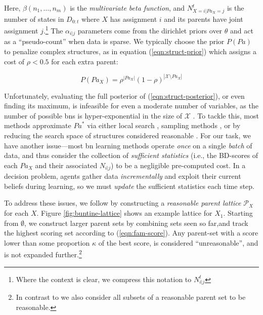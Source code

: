 \documentclass{article}
\newcommand{\bn}{{\sc bn}}
\newcommand{\Pa}{\mathit{Pa}}
\begin{document}
	Here, $\beta(n_1, \dots, n_m)$ is the \emph{multivariate beta function}, and $N^t_{X=i|\Pa_X=j}$ is the number of states in $D_{0:t}$ where $X$ has assignment $i$ and its parents have joint assignment $j$.\footnote{Where the context is clear, we compress this notation to $N^t_{i|j}$} The $\alpha_{i|j}$ parameters come from the dirichlet priors over $\theta$ and act as a ``pseudo-count'' when data is sparse. We typically choose the prior $P(\Pa)$ to penalize complex structures, as in equation (\ref{eqn:struct-prior}) which assigns a cost of $\rho < 0.5$ for each extra parent:
	
	\begin{equation}
	\label{eqn:struct-prior}
	P(\Pa_X) = \rho^{|\Pa_X|} (1 - \rho)^{|\mathcal{X} \setminus \Pa_X|}
	\end{equation}
	
	Unfortunately, evaluating the full posterior of (\ref{eqn:struct-posterior}), or even finding its maximum, is infeasible for even a moderate number of variables, as the number of possible \bn{}s is hyper-exponential in the size of $\mathcal{X}$ \cite{tian_computing_2009}. To tackle this, most methods approximate $\Pa^*$ via either local search \cite{teyssier_ordering-based_2005}, sampling methods \cite{madigan_bayesian_1995}, or by reducing the search space of structures considered reasonable \cite{buntine_theory_1991}. For our task, we have another issue---most \bn{} learning methods operate \emph{once} on a single \emph{batch} of data, and thus consider the collection of \emph{sufficient statistics} (i.e., the BD-scores of each $\Pa_X$ and their associated $N_{i|j}$) to be a negligible pre-computed cost. In a decision problem, agents gather data \emph{incrementally} and exploit their current beliefs during learning, so we must \emph{update} the sufficient statistics each time step.
	
	To address these issues, we follow \citet{buntine_theory_1991} by constructing a \emph{reasonable parent lattice} $\mathcal{P}_X$ for each $X$. Figure \ref{fig:buntine-lattice} shows an example lattice for $X_1$. Starting from $\emptyset$, we construct larger parent sets by combining sets seen so far,and track the highest scoring set according to (\ref{eqn:fam-score}). Any parent-set with a score lower than some proportion $\kappa$ of the best score, is considered ``unreasonable'', and is not expanded further.\footnote{In contrast to \citet{buntine_theory_1991} we also consider all subsets of a reasonable parent set to be reasonable.}
		
\end{document}
